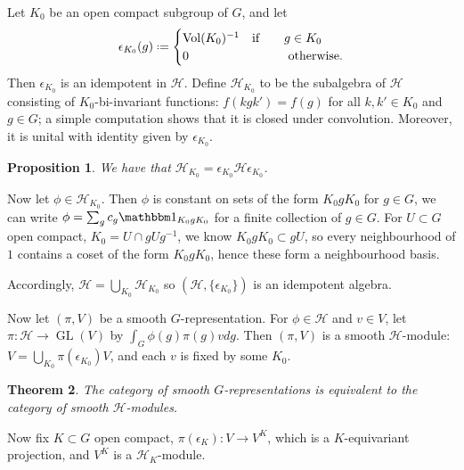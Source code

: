 \documentclass[11pt]{report}
\let\mc\mathcal
\newcommand{\1}{\mathbbm 1}
\newcommand*{\defeq}{\mathrel{\vcenter{\baselineskip0.5ex \lineskiplimit0pt
      \hbox{\scriptsize.}\hbox{\scriptsize.}}}%
  =}
\DeclareMathOperator{\Vol}{Vol}
\DeclareMathOperator{\GL}{GL}
\theoremstyle{plain}
\newtheorem{thm}{Theorem}[section]
\newcounter{ex}
\newtheorem{prop}[thm]{Proposition}
\theoremstyle{definition}
\theoremstyle{remark}
\numberwithin{equation}{section}
\begin{document}
Let $K_{0}$ be an open compact subgroup of $G$, and let
\begin{equation}
  \label{eq:7}
  \epsilon_{K_{0}}(g) \defeq \begin{cases}
                        \Vol(K_{0})^{-1} \qq{if} &g \in K_{0}\\
                        0 &\text{ otherwise.}
                      \end{cases}
                    \end{equation}
Then $\epsilon_{K_{0}}$ is an idempotent in $\mc H$. Define $\mc H_{K_{0}}$
to be the subalgebra of $\mc H$ consisting of $K_{0}$-bi-invariant
functions: $f(kgk') = f(g)$ for all $k,k' \in K_{0}$ and $g \in G$; a
simple computation shows that it is closed under
convolution. Moreover, it is unital with identity given by $\epsilon_{K_{0}}$.

\begin{prop}
  We have that $\mc H_{K_{0}} = \epsilon_{K_{0}}\mc H \epsilon_{K_{0}}$. 
\end{prop}
Now let $\phi \in \mc H_{K_{0}}$. Then $\phi$ is constant on sets of the form
$K_{0}gK_{0}$ for $g \in G$, we can write $\phi = \sum_{g} c_{g}
\1_{K_{0}gK_{0}}$ for a finite collection of $g \in G$. For $U \subset G$ open
compact, $K_{0} = U \cap gUg^{-1}$, we know $K_{0}gK_{0} \subset gU$, so every
neighbourhood of $1$ contains a coset of the form $K_{0}gK_{0}$, hence these
form a neighbourhood basis.

Accordingly, $\mc H = \bigcup_{K_{0}} \mc H_{K_{0}}$ so $(\mc H,
\{\epsilon_{K_{0}}\})$ is an idempotent algebra.

Now let $(\pi,V)$ be a smooth $G$-representation. For $\phi \in \mc H$ and $v
\in V$, let $\pi : \mc H \to \GL(V)$ by $\int_{G}\phi(g)\pi(g)vdg$. Then $(\pi,V)$ is
a smooth $\mc H$-module: $V = \bigcup_{K_{0}}\pi(\epsilon_{K_{0}})V$, and each $v $
is fixed by some $K_{0}$.

\begin{thm}
  The category of smooth $G$-representations is equivalent to the
  category of smooth
  $\mc H$-modules.
\end{thm}


Now fix $K \subset G$ open compact, $\pi(\epsilon_{K}) \colon V \to V^{K}$, which is a
$K$-equivariant projection, and $V^{K}$ is a $\mc H_{K}$-module.
\end{document}
